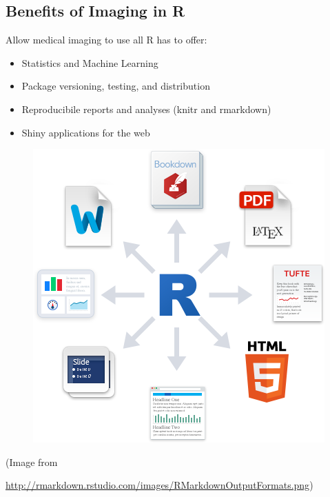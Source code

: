 \documentclass[final]{beamer}\usepackage[]{graphicx}\usepackage[]{color}
\begin{document}
\begin{frame}[fragile]
\begin{table}[!htb]
\begin{minipage}{0.21\linewidth}
% 
% 
% 

\subsection{Benefits of Imaging in R}

Allow medical imaging to use all R has to offer:
  
\begin{multicols}{2}

\begin{itemize}
\item Statistics and Machine Learning
\item Package versioning, testing, and distribution 
\item Reproducibile reports and analyses (knitr and rmarkdown)
\item Shiny applications for the web
\end{itemize}

\vfill
\columnbreak
\begin{figure}[h]
\centering
\includegraphics[width=\linewidth]{figures/RMarkdownOutputFormats.png}
\end{figure}
{\tiny (Image from \\ 
\begin{sloppypar}
\url{http://rmarkdown.rstudio.com/images/RMarkdownOutputFormats.png})
\end{sloppypar}
}
\end{multicols}


\end{minipage}
\end{table}
\end{frame}
\end{document}
